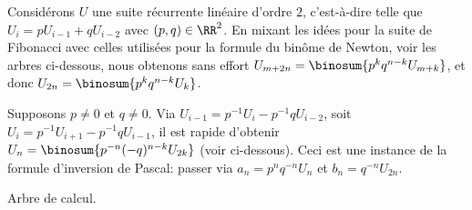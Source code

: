 

\begin{remark}
	Considérons $U$ une suite récurrente linéaire d'ordre $2$,
	c'est-à-dire telle que
	$U_{i} = p U_{i-1} + q U_{i-2}$ avec $(p, q) \in \RR^2$.
	En mixant les idées pour la suite de Fibonacci avec celles utilisées pour la formule du binôme de Newton, voir les arbres ci-dessous, nous obtenons sans effort
	$U_{m+2n} = \binosum{p^k q^{n-k} U_{m+k}}$,
	et donc
	$U_{2n} = \binosum{p^k q^{n-k} U_{k}}$.

    	        {\intertree}{}
	        
	
	Supposons $p \neq 0$ et $q \neq 0$.
	Via  $U_{i-1} = p^{-1} U_{i} - p^{-1} q U_{i-2}$, 
	soit $U_{i} = p^{-1} U_{i+1} - p^{-1} q U_{i-1}$,
	il est rapide d'obtenir
	$U_n = \binosum{p^{-n} (-q)^{n-k} U_{2k}}$ (voir ci-dessous).
	Ceci est une instance de la formule d'inversion de Pascal:
    passer via
    $a_n = p^n q^{-n} U_{n}$
    et
    $b_n = q^{-n} U_{2n}$.

    \begin{center}
    	\itshape\centering
        
    
        Arbre de calcul.
    \end{center}
\end{remark}
